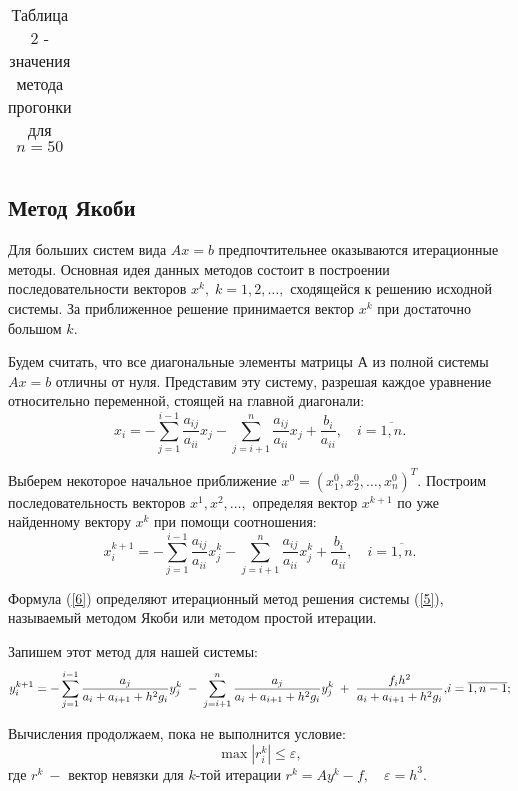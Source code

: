 \documentclass[a4paper,12pt]{article}
\begin{document}
{\begin{table}[h]
\begin{tabular}{|c|c|c|c|}
    \end{tabular}
    \caption*{\small{Таблица 2 - значения метода прогонки для $n = 50$}}
\end{table}

\subsection{Метод Якоби}
\hspace*{1.25cm}Для больших систем вида $Ax=b$ предпочтительнее оказываются итерационные методы. 
Основная идея данных методов состоит в построении последовательности векторов $x^k, \; k=1,2,\dots,$ 
сходящейся к решению исходной системы. За приближенное решение принимается вектор $x^k$ при достаточно большом $k$.

Будем считать, что все диагональные элементы матрицы $А$ из полной системы $Ax=b$ отличны от нуля. 
Представим эту систему, разрешая каждое уравнение относительно переменной, стоящей на главной диагонали: 
\begin{equation}
x_i = - \sum\limits_{j=1}^{i-1} \frac{a_{ij}}{a_{ii}}x_j - \sum\limits_{j=i+1}^n \frac{a_{ij}}{a_{ii}}x_j+\frac{b_i}{a_{ii}}, \quad i = \overline{1,n}.
 \label{5}
\end{equation}

Выберем некоторое начальное приближение $x^0=(x_1^0, x_2^0, {\dots}, x_n^0)^T$. 
Построим последова\-тель\-ность векторов $x^1, x^2, {\dots},$ определяя вектор $x^{k+1}$ по уже найденному вектору $x^k$ при помощи соотношения: 
\begin{equation}
x_i^{k+1}= - \sum\limits_{j=1}^{i-1} \frac{a_{ij}}{a_{ii}}x_j^k - \sum\limits_{j=i+1}^n \frac{a_{ij}}{a_{ii}}x_j^k+\frac{b_i}{a_{ii}}, \quad i = \overline{1,n}. 
 \label{6}
\end{equation}

Формула (\ref{6}) определяют итерационный метод решения системы (\ref{5}), называемый мето\-дом Якоби или методом простой итерации.

Запишем этот метод для нашей системы:
\begin{equation}
    y_i^{k+1}=  -\sum\limits_{j=1}^{i-1}\frac{a_j}{a_i+a_{i+1}+h^2 g_i}y_j^{k} \; - \;\sum\limits_{j=i+1}^{n}\frac{a_{j}}{a_i+a_{i+1}+h^2 g_i}y_j^k\; +\; \frac{f_i h^2}{a_i+a_{i+1}+h^2 g_i},$$$$
    i=\overline{1, n-1};
     \label{8}
\end{equation}

Вычисления продолжаем, пока не выполнится условие:
$$\max\limits |r_i^k| \leq \varepsilon,$$
где $r^k ~-$ вектор невязки для $k$-той итерации $r^k=Ay^k-f, \quad \varepsilon=h^3.$

}
\end{document}
